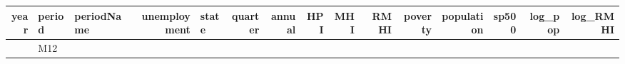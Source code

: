 \documentclass[
]{article}
\begin{document}
\begin{longtable}[]{@{}rllrlrrrrrrrrrr@{}}
\begin{minipage}[b]{0.03\columnwidth}
year\strut
\end{minipage} & \begin{minipage}[b]{0.04\columnwidth}\raggedright
period\strut
\end{minipage} & \begin{minipage}[b]{0.06\columnwidth}\raggedright
periodName\strut
\end{minipage} & \begin{minipage}[b]{0.07\columnwidth}\raggedleft
unemployment\strut
\end{minipage} & \begin{minipage}[b]{0.03\columnwidth}\raggedright
state\strut
\end{minipage} & \begin{minipage}[b]{0.04\columnwidth}\raggedleft
quarter\strut
\end{minipage} & \begin{minipage}[b]{0.04\columnwidth}\raggedleft
annual\strut
\end{minipage} & \begin{minipage}[b]{0.04\columnwidth}\raggedleft
HPI\strut
\end{minipage} & \begin{minipage}[b]{0.03\columnwidth}\raggedleft
MHI\strut
\end{minipage} & \begin{minipage}[b]{0.03\columnwidth}\raggedleft
RMHI\strut
\end{minipage} & \begin{minipage}[b]{0.04\columnwidth}\raggedleft
poverty\strut
\end{minipage} & \begin{minipage}[b]{0.06\columnwidth}\raggedleft
population\strut
\end{minipage} & \begin{minipage}[b]{0.03\columnwidth}\raggedleft
sp500\strut
\end{minipage} & \begin{minipage}[b]{0.05\columnwidth}\raggedleft
log\_pop\strut
\end{minipage} & \begin{minipage}[b]{0.05\columnwidth}\raggedleft
log\_RMHI\strut
\end{minipage}\tabularnewline
\midrule
\endhead
\begin{minipage}[t]{0.03\columnwidth}\raggedleft
1984\strut
\end{minipage} & \begin{minipage}[t]{0.04\columnwidth}\raggedright
M12\strut
\end{minipage} & \begin{minipage}[t]{0.06\columnwidth}\raggedright

\end{minipage}
\end{longtable}
\end{document}
